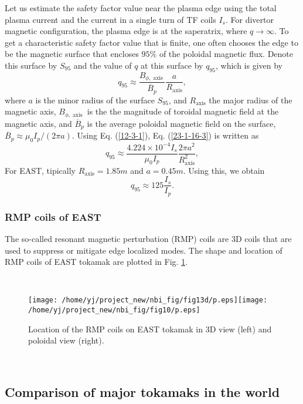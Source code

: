 \documentclass{llncs}
\newcommand{\tmop}[1]{\ensuremath{\operatorname{#1}}}
\begin{document}
Let us estimate the safety factor value near the plasma edge using the total
plasma current and the current in a single turn of TF coils $I_s$. For
divertor magnetic configuration, the plasma edge is at the saperatrix, where
$q \rightarrow \infty$. To get a characteristic safety factor value that is
finite, one often chooses the edge to be the magnetic surface that encloses
$95\%$ of the poloidal magnetic flux. Denote this surface by $S_{95}$ and the
value of $q$ at this surface by $q_{95}$, which is given by
\begin{equation}
  \label{23-1-16-3} q_{95} \approx \frac{B_{\phi,
  \tmop{axis}}}{\overline{B}_p} \frac{a}{R_{\tmop{axis}}},
\end{equation}
where $a$ is the minor radius of the surface $S_{95}$, and $R_{\tmop{axis}}$
the major radius of the magnetic axis, $B_{\phi, \tmop{axis}}$ is the the
magnitude of toroidal magnetic field at the magnetic axis, and
$\overline{B}_p$ is the average poloidal magnetic field on the surface,
$\overline{B}_p \approx \mu_0 I_p / (2 \pi a)$. Using Eq. (\ref{12-3-1}), Eq.
(\ref{23-1-16-3}) is written as
\begin{equation}
  q_{95} \approx \frac{4.224 \times 10^{- 4} I_s}{\mu_0 I_p} \frac{2 \pi
  a^2}{R_{\tmop{axis}}^2},
\end{equation}
For EAST, tipically $R_{\tmop{axis}} = 1.85 m$ and $a = 0.45 m$. Using this,
we obtain
\begin{equation}
  q_{95} \approx 125 \frac{I_s}{I_p} .
\end{equation}


\subsubsection{RMP coils of EAST}

The so-called resonant magnetic perturbation (RMP) coils are 3D coils that are
used to suppress or mitigate edge localized modes. The shape and location of
RMP coils of EAST tokamak are plotted in Fig. \ref{19-5-4-p2}.

\

\begin{figure}[h]
  \texttt{[image: /home/yj/project\_new/nbi\_fig/fig13d/p.eps]}\texttt{[image: /home/yj/project\_new/nbi\_fig/fig10/p.eps]}
  \caption{\label{19-5-4-p2}Location of the RMP coils on EAST tokamak in 3D
  view (left) and poloidal view (right).}
\end{figure}

\

\subsection{Comparison of major tokamaks in the world}
\end{document}
